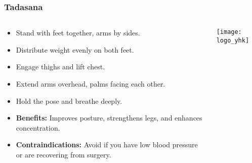 \begin{frame}[fragile]\frametitle{Tadasana}
\begin{columns}
    \begin{column}[T]{0.5\linewidth}
      \begin{itemize}
        \item Stand with feet together, arms by sides.
        \item Distribute weight evenly on both feet.
        \item Engage thighs and lift chest.
        \item Extend arms overhead, palms facing each other.
        \item Hold the pose and breathe deeply.
        \item \textbf{Benefits:} Improves posture, strengthens legs, and enhances concentration.
        \item \textbf{Contraindications:} Avoid if you have low blood pressure or are recovering from surgery.
      \end{itemize}
    \end{column}
    \begin{column}[T]{0.5\linewidth}
        \begin{center}
        \texttt{[image: logo\_yhk]}
        \end{center}    
    \end{column}
  \end{columns}
\end{frame}

